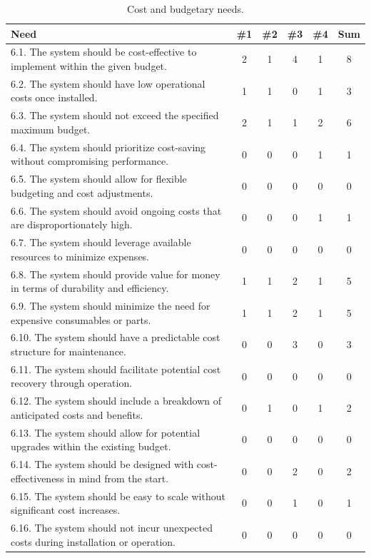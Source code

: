 \documentclass[12pt]{report}
\begin{document}
\renewcommand{\thetable}{\thechapter.1f}
\newpage
\begin{table}[H]
\centering
\caption{Cost and budgetary needs.}
\label{table:1f}
\begin{tabular}{|p{10cm}|c|c|c|c|c|}
\hline
\textbf{Need} & \textbf{\#1} & \textbf{\#2} & \textbf{\#3} & \textbf{\#4} & \textbf{Sum} \\
\hline
6.1. The system should be cost-effective to implement within the given budget. & 2 & 1 & 4 & 1 & \cellcolor{yellow}8 \\
6.2. The system should have low operational costs once installed. & 1 & 1 & 0 & 1 & 3 \\
6.3. The system should not exceed the specified maximum budget. & 2 & 1 & 1 & 2 & 6 \\
6.4. The system should prioritize cost-saving without compromising performance. & 0 & 0 & 0 & 1 & 1 \\
6.5. The system should allow for flexible budgeting and cost adjustments. & 0 & 0 & 0 & 0 & 0 \\
6.6. The system should avoid ongoing costs that are disproportionately high. & 0 & 0 & 0 & 1 & 1 \\
6.7. The system should leverage available resources to minimize expenses. & 0 & 0 & 0 & 0 & 0 \\
6.8. The system should provide value for money in terms of durability and efficiency. & 1 & 1 & 2 & 1 & 5 \\
6.9. The system should minimize the need for expensive consumables or parts. & 1 & 1 & 2 & 1 & 5 \\
6.10. The system should have a predictable cost structure for maintenance. & 0 & 0 & 3 & 0 & 3 \\
6.11. The system should facilitate potential cost recovery through operation. & 0 & 0 & 0 & 0 & 0 \\
6.12. The system should include a breakdown of anticipated costs and benefits. & 0 & 1 & 0 & 1 & 2 \\
6.13. The system should allow for potential upgrades within the existing budget. & 0 & 0 & 0 & 0 & 0 \\
6.14. The system should be designed with cost-effectiveness in mind from the start. & 0 & 0 & 2 & 0 & 2 \\
6.15. The system should be easy to scale without significant cost increases. & 0 & 0 & 1 & 0 & 1 \\
6.16. The system should not incur unexpected costs during installation or operation. & 0 & 0 & 0 & 0 & 0 \\

\end{tabular}
\end{table}
\end{document}
